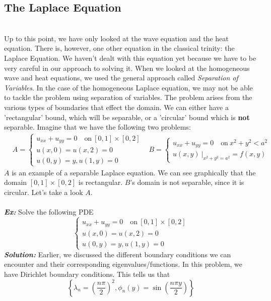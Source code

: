 \documentclass{article}
\begin{document}
\subsection{The Laplace Equation}
\noindent \\
\indent Up to this point, we have only looked at the wave equation and the heat equation. There is, however, one other equation in the classical trinity: the Laplace Equation. We haven't dealt with this equation yet because we have to be very careful in our approach to solving it. When we looked at the homogeneous wave and heat equations, we used the general approach called \textit{Separation of Variables}. In the case of the homogeneous Laplace equation, we may not be able to tackle the problem using separation of variables. The problem arises from the various types of boundaries that effect the domain. We can either have a 'rectangular' bound, which will be separable, or a 'circular' bound which is \textbf{not} separable. Imagine that we have the following two problems:
\begin{align*}
&A =\begin{cases}
u_{xx} + u_{yy} = 0\quad \text{on}\ [0,1]\times[0,2]\\
u(x,0) = u(x,2) = 0\\
u(0,y) = y, u(1,y) = 0
\end{cases}
&B =\begin{cases}
u_{xx} + u_{yy} = 0\quad \text{on}\ x^{2} + y^{2} < a^{2}\\
u(x,y)\ \big |_{x^{2} + y^{2} = a^{2}} = f(x,y)
\end{cases}
\end{align*}
$A$ is an example of a separable Laplace equation. We can see graphically that the domain $[0,1] \times [0,2]$ is rectangular. $B$'s domain is not separable, since it is circular. Let's take a look $A$.\\\\
\noindent \textbf{\textit{Ex:}} Solve the following PDE
\[
\begin{cases*}
u_{xx} + u_{yy} = 0\quad \text{on}\ [0,1]\times[0,2]\\
u(x,0) = u(x,2) = 0\\
u(0,y) = y, u(1,y) = 0
\end{cases*}
\]
\indent \textbf{\textit{Solution:}} Earlier, we discussed the different boundary conditions we can encounter and their corresponding eigenvalues/functions. In this problem, we have Dirichlet boundary conditions. This tells us that
\[
\left\{\lambda_{n} = \left(\frac{n\pi}{2}\right)^{2}, \phi_{n}(y) = \sin{\left(\frac{n\pi y}{2}\right)}\right\}
\]
\end{document}
